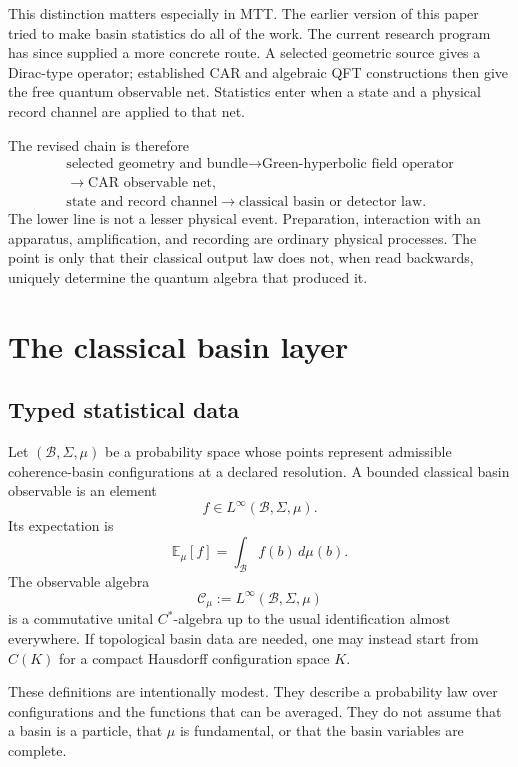 \documentclass[11pt]{article}
\newcommand{\C}{\mathcal C}
\newcommand{\B}{\mathcal B}
\newcommand{\E}{\mathbb E}
\begin{document}
This distinction matters especially in MTT.  The earlier version of this
paper tried to make basin statistics do all of the work.  The current
research program has since supplied a more concrete route.  A selected
geometric source gives a Dirac-type operator; established CAR and algebraic
QFT constructions then give the free quantum observable net.  Statistics
enter when a state and a physical record channel are applied to that net.

The revised chain is therefore
\[
\begin{gathered}
\text{selected geometry and bundle}
\longrightarrow
\text{Green-hyperbolic field operator}\\
\longrightarrow
\text{CAR observable net},\\
\text{state and record channel}
\longrightarrow
\text{classical basin or detector law}.
\end{gathered}
\]
The lower line is not a lesser physical event.  Preparation, interaction
with an apparatus, amplification, and recording are ordinary physical
processes.  The point is only that their classical output law does not,
when read backwards, uniquely determine the quantum algebra that produced
it.

\section{The classical basin layer}

\subsection{Typed statistical data}

Let \((\B,\Sigma,\mu)\) be a probability space whose points represent
admissible coherence-basin configurations at a declared resolution.  A
bounded classical basin observable is an element
\[
 f\in L^\infty(\B,\Sigma,\mu).
\]
Its expectation is
\[
 \E_\mu[f]=\int_{\B}f(b)\,d\mu(b).
\]
The observable algebra
\[
 \C_\mu:=L^\infty(\B,\Sigma,\mu)
\]
is a commutative unital \(C^*\)-algebra up to the usual identification
almost everywhere.  If topological basin data are needed, one may instead
start from \(C(K)\) for a compact Hausdorff configuration space \(K\).

These definitions are intentionally modest.  They describe a probability
law over configurations and the functions that can be averaged.  They do
not assume that a basin is a particle, that \(\mu\) is fundamental, or that
the basin variables are complete.
\end{document}
